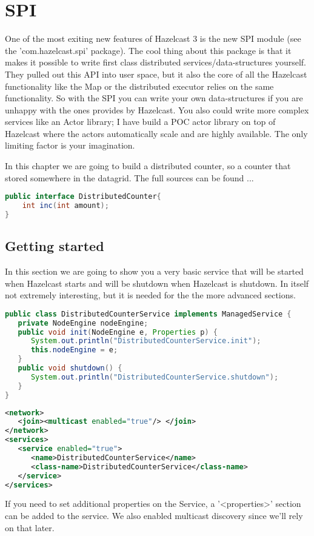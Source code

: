 \chapter{SPI}

One of the most exiting new features of Hazelcast 3 is the new SPI module (see the 'com.hazelcast.spi' package). The cool thing about this package is that it makes it possible to write first class distributed services/data-structures yourself. They pulled out this API into user space, but it also the core of all the Hazelcast functionality like the Map or the distributed executor relies on the same functionality. So with the SPI you can write your own data-structures if you are unhappy with the ones provides by Hazelcast. You also could write more complex services like an Actor library; I have build a POC actor library on top of Hazelcast where the actors automatically scale and are highly available. The only limiting factor is your imagination.

In this chapter we are going to build a distributed counter, so a counter that stored somewhere in the datagrid. The full sources can be found ...

\begin{lstlisting}[language=java]
public interface DistributedCounter{
    int inc(int amount);
}
\end{lstlisting}

\section{Getting started}
In this section we are going to show you a very basic service that will be started when Hazelcast starts and will be shutdown when Hazelcast is shutdown. In itself not extremely interesting, but it is needed for the the more advanced sections.

\begin{lstlisting}[language=java]
public class DistributedCounterService implements ManagedService {
   private NodeEngine nodeEngine;
   public void init(NodeEngine e, Properties p) {
      System.out.println("DistributedCounterService.init");
      this.nodeEngine = e;
   }
   public void shutdown() {
      System.out.println("DistributedCounterService.shutdown");
   }
}
\end{lstlisting}

\begin{lstlisting}[language=xml]
<network>
   <join><multicast enabled="true"/> </join>
</network>
<services>
   <service enabled="true">
      <name>DistributedCounterService</name>
      <class-name>DistributedCounterService</class-name>
   </service>
</services>
\end{lstlisting}
If you need to set additional properties on the Service, a '<properties>' section can be added to the service. We also enabled multicast discovery since we'll rely on that later.

